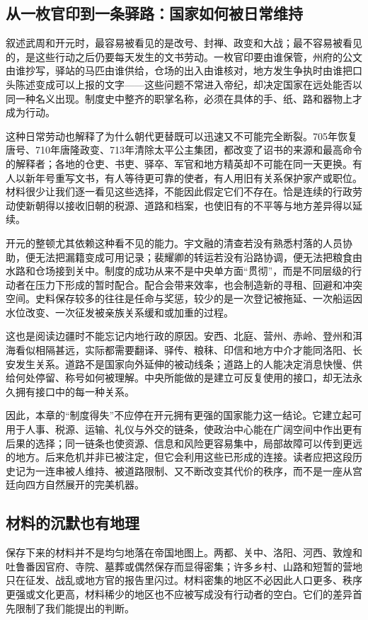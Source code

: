 \subsection{从一枚官印到一条驿路：国家如何被日常维持}
叙述武周和开元时，最容易被看见的是改号、封禅、政变和大战；最不容易被看见的，是这些行动之后仍要每天发生的文书劳动。一枚官印要由谁保管，州府的公文由谁抄写，驿站的马匹由谁供给，仓场的出入由谁核对，地方发生争执时由谁把口头陈述变成可以上报的文字——这些问题不常进入帝纪，却决定国家在远处能否以同一种名义出现。制度史中整齐的职掌名称，必须在具体的手、纸、路和器物上才成为行动。

这种日常劳动也解释了为什么朝代更替既可以迅速又不可能完全断裂。705年恢复唐号、710年唐隆政变、713年清除太平公主集团，都改变了诏书的来源和最高命令的解释者；各地的仓吏、书吏、驿卒、军官和地方精英却不可能在同一天更换。有人以新年号重写文书，有人等待更可靠的使者，有人用旧有关系保护家产或职位。材料很少让我们逐一看见这些选择，不能因此假定它们不存在。恰是连续的行政劳动使新朝得以接收旧朝的税源、道路和档案，也使旧有的不平等与地方差异得以延续。

开元的整顿尤其依赖这种看不见的能力。宇文融的清查若没有熟悉村落的人员协助，便无法把漏籍变成可用记录；裴耀卿的转运若没有沿路协调，便无法把粮食由水路和仓场接到关中。制度的成功从来不是中央单方面“贯彻”，而是不同层级的行动者在压力下形成的暂时配合。配合会带来效率，也会制造新的寻租、回避和冲突空间。史料保存较多的往往是任命与奖惩，较少的是一次登记被拖延、一次船运因水位改变、一次征发被亲族关系缓和或加重的过程。

这也是阅读边疆时不能忘记内地行政的原因。安西、北庭、营州、赤岭、登州和洱海看似相隔甚远，实际都需要翻译、驿传、粮秣、印信和地方中介才能同洛阳、长安发生关系。道路不是国家向外延伸的被动线条；道路上的人能决定消息快慢、供给何处停留、称号如何被理解。中央所能做的是建立可反复使用的接口，却无法永久拥有接口中的每一种关系。

因此，本章的“制度得失”不应停在开元拥有更强的国家能力这一结论。它建立起可用于人事、税源、运输、礼仪与外交的链条，使政治中心能在广阔空间中作出更有后果的选择；同一链条也使资源、信息和风险更容易集中，局部故障可以传到更远的地方。后来危机并非已被注定，但它会利用这些已形成的连接。读者应把这段历史记为一连串被人维持、被道路限制、又不断改变其代价的秩序，而不是一座从宫廷向四方自然展开的完美机器。
\subsection{材料的沉默也有地理}
保存下来的材料并不是均匀地落在帝国地图上。两都、关中、洛阳、河西、敦煌和吐鲁番因官府、寺院、墓葬或偶然保存而显得密集；许多乡村、山路和短暂的营地只在征发、战乱或地方官的报告里闪过。材料密集的地区不必因此人口更多、秩序更强或文化更高，材料稀少的地区也不应被写成没有行动者的空白。它们的差异首先限制了我们能提出的判断。

